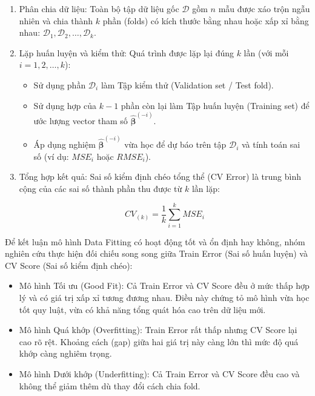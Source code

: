 \begin{enumerate}[topsep=0pt, itemsep=2.5pt, leftmargin=1.5cm]
    \item Phân chia dữ liệu: Toàn bộ tập dữ liệu gốc $\mathcal{D}$ gồm $n$ mẫu được xáo trộn ngẫu nhiên và chia thành $k$ phần (folds) có kích thước bằng nhau hoặc xấp xỉ bằng nhau: $\mathcal{D}_1, \mathcal{D}_2, \dots, \mathcal{D}_k$.
    \item Lặp huấn luyện và kiểm thử: Quá trình được lặp lại đúng $k$ lần (với mỗi $i = 1, 2, \dots, k$):
    \begin{itemize}[topsep=0pt, itemsep=2.5pt, leftmargin=1.5cm]
        \item Sử dụng phần $\mathcal{D}_i$ làm Tập kiểm thử (Validation set / Test fold).
        \item Sử dụng hợp của $k-1$ phần còn lại làm Tập huấn luyện (Training set) để ước lượng vector tham số $\hat{\boldsymbol{\beta}}^{(-i)}$.
        \item Áp dụng nghiệm $\hat{\boldsymbol{\beta}}^{(-i)}$ vừa học để dự báo trên tập $\mathcal{D}_i$ và tính toán sai số (ví dụ: $MSE_i$ hoặc $RMSE_i$).
    \end{itemize}
    \item Tổng hợp kết quả: Sai số kiểm định chéo tổng thể (CV Error) là trung bình cộng của các sai số thành phần thu được từ $k$ lần lặp:

    $$CV_{(k)} = \frac{1}{k} \sum_{i=1}^{k} MSE_i$$
\end{enumerate}

Để kết luận mô hình Data Fitting có hoạt động tốt và ổn định hay không, nhóm nghiên cứu thực hiện đối chiếu song song giữa Train Error (Sai số huấn luyện) và CV Score (Sai số kiểm định chéo):

\begin{itemize}[topsep=0pt, itemsep=2.5pt, leftmargin=1.5cm]
    \item Mô hình Tối ưu (Good Fit): Cả Train Error và CV Score đều ở mức thấp hợp lý và có giá trị xấp xỉ tương đương nhau. Điều này chứng tỏ mô hình vừa học tốt quy luật, vừa có khả năng tổng quát hóa cao trên dữ liệu mới.
    \item Mô hình Quá khớp (Overfitting): Train Error rất thấp nhưng CV Score lại cao rõ rệt. Khoảng cách (gap) giữa hai giá trị này càng lớn thì mức độ quá khớp càng nghiêm trọng.
    \item Mô hình Dưới khớp (Underfitting): Cả Train Error và CV Score đều cao và không thể giảm thêm dù thay đổi cách chia fold.
\end{itemize}


